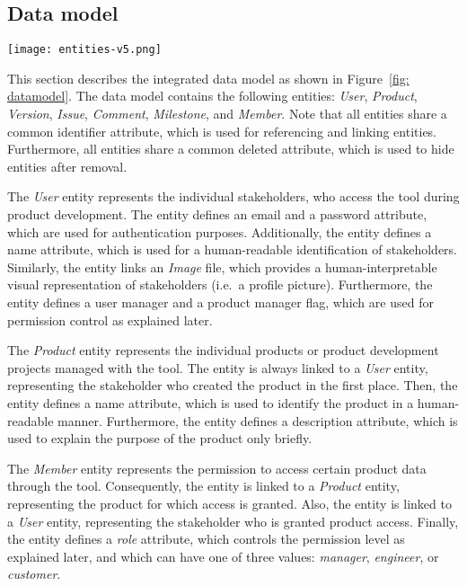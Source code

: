 \subsection{Data model}

\begin{figure*}[ht]
    \centering
    \texttt{[image: entities-v5.png]}
    \caption{Integrated data model for improved information exchange between customers, project managers, requirements engineers, and product designers}
    \label{fig: datamodel}
\end{figure*}

This section describes the integrated data model as shown in Figure~\ref{fig: datamodel}.
The data model contains the following entities: \textit{User}, \textit{Product}, \textit{Version}, \textit{Issue}, \textit{Comment}, \textit{Milestone}, and \textit{Member}.
Note that all entities share a common identifier attribute, which is used for referencing and linking entities.
Furthermore, all entities share a common deleted attribute, which is used to hide entities after removal.

The \textit{User} entity represents the individual stakeholders, who access the tool during product development.
The entity defines an email and a password attribute, which are used for authentication purposes.
Additionally, the entity defines a name attribute, which is used for a human-readable identification of stakeholders.
Similarly, the entity links an \textit{Image} file, which provides a human-interpretable visual representation of stakeholders (i.e.\ a profile picture).
Furthermore, the entity defines a user manager and a product manager flag, which are used for permission control as explained later.

The \textit{Product} entity represents the individual products or product development projects managed with the tool.
The entity is always linked to a \textit{User} entity, representing the stakeholder who created the product in the first place.
Then, the entity defines a name attribute, which is used to identify the product in a human-readable manner.
Furthermore, the entity defines a description attribute, which is used to explain the purpose of the product only briefly.

The \textit{Member} entity represents the permission to access certain product data through the tool.
Consequently, the entity is linked to a \textit{Product} entity, representing the product for which access is granted.
Also, the entity is linked to a \textit{User} entity, representing the stakeholder who is granted product access.
Finally, the entity defines a \textit{role} attribute, which controls the permission level as explained later, and which can have one of three values: \textit{manager}, \textit{engineer}, or \textit{customer}.

